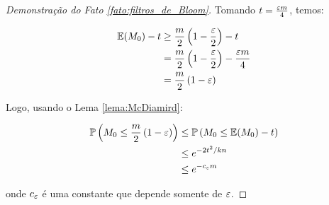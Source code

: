 \begin{proof}[Demonstração do Fato \ref{fato:filtros_de_Bloom}]
Tomando $t = \frac{\varepsilon m}{4}$, temos:

\begin{align*}
  \mathbb{E}(M_{0}) - t &\geq \frac{m}{2}\left(1-\frac{\varepsilon}{2}\right) - t\\
                        &= \frac{m}{2}\left(1-\frac{\varepsilon}{2}\right) - \frac{\varepsilon m}{4}\\
                        &= \frac{m}{2}\left(1-\varepsilon\right)
\end{align*}

Logo, usando o Lema \ref{lema:McDiamird}:

\begin{align*}
  \mathbb{P}\left(M_{0}\leq \frac{m}{2}\left(1-\varepsilon\right)\right) &\leq \mathbb{P}\left(M_{0}\leq \mathbb{E}(M_{0})-t\right)\\
                                                                  &\leq e^{-2t^2/kn}\\
                                                                  &\leq e^{-c_{\varepsilon}m}
\end{align*}

onde $c_{\varepsilon}$ é uma constante que depende somente de $\varepsilon$.

\end{proof}

